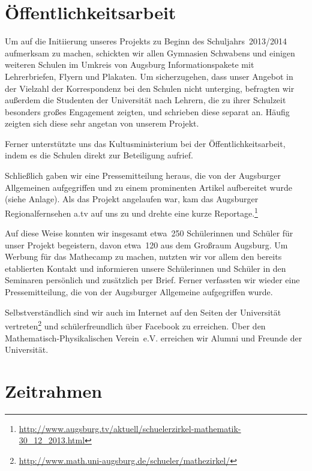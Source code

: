 \documentclass[12pt]{zettel}
\begin{document}
\section{Öffentlichkeitsarbeit}

Um auf die Initiierung unseres Projekts zu Beginn des Schuljahrs~2013/2014
aufmerksam zu machen, schickten wir allen Gymnasien Schwabens und einigen
weiteren Schulen im Umkreis von Augsburg Informationspakete mit Lehrerbriefen,
Flyern und Plakaten. Um sicherzugehen, dass unser Angebot in der
Vielzahl der Korrespondenz bei den Schulen nicht unterging, befragten wir außerdem
die Studenten der Universität nach Lehrern, die zu ihrer Schulzeit
besonders großes Engagement zeigten, und schrieben diese separat an.
Häufig zeigten sich diese sehr angetan von unserem Projekt.

Ferner unterstützte uns das Kultusministerium bei der Öffentlichkeitsarbeit, indem es die Schulen direkt zur Beteiligung aufrief.

Schließlich gaben wir eine Pressemitteilung heraus, die von der
Augsburger Allgemeinen aufgegriffen und zu einem prominenten Artikel aufbereitet
wurde (siehe Anlage). Als das Projekt angelaufen war, kam das Augsburger
Regionalfernsehen a.tv auf uns zu und drehte eine kurze Reportage.\footnote{\href{http://www.augsburg.tv/aktuell/schuelerzirkel-mathematik-30_12_2013.html}{\textsf{http:/\!/www.augsburg.tv/aktuell/schuelerzirkel-mathematik-30\_{}12\_{}2013.html}}}

Auf diese Weise konnten wir insgesamt etwa~250 Schülerinnen und Schüler für
unser Projekt begeistern, davon etwa~120 aus dem Großraum Augsburg. Um Werbung für
das Mathecamp zu machen, nutzten wir vor allem den bereits etablierten Kontakt
und informieren unsere Schülerinnen und Schüler in den Seminaren persönlich und
zusätzlich per Brief. Ferner verfassten wir wieder eine Pressemitteilung, die
von der Augsburger Allgemeine aufgegriffen wurde.

Selbstverständlich sind wir auch im Internet auf den Seiten der Universität
vertreten\footnote{\href{http://www.math.uni-augsburg.de/schueler/mathezirkel/}{\textsf{http:/\!/www.math.uni-augsburg.de/schueler/mathezirkel/}}} und schülerfreundlich über Facebook zu erreichen. Über den
Mathematisch-Physikalischen Verein~e.V. erreichen wir Alumni und Freunde der
Universität.


\section{Zeitrahmen}
\end{document}
